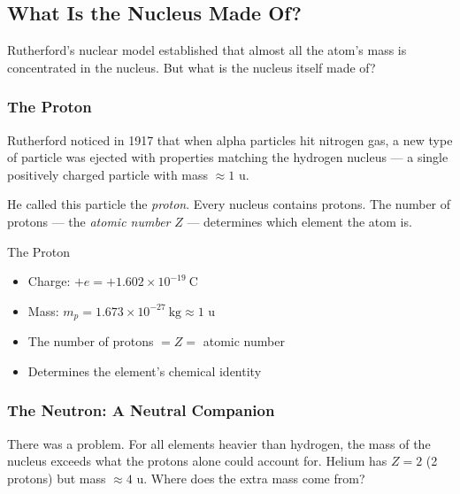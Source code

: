 \documentclass[12pt, a4paper]{book}
\theoremstyle{definition}
\newcommand{\newterm}[1]{\textit{\textcolor{DiscoveryColor}{#1}}}
\begin{document}
\subsection{What Is the Nucleus Made Of?}

Rutherford's nuclear model established that almost all
the atom's mass is concentrated in the nucleus.
But what is the nucleus itself made of?

\subsubsection{The Proton}

Rutherford noticed in 1917 that when alpha particles
hit nitrogen gas, a new type of particle was ejected
with properties matching the hydrogen nucleus ---
a single positively charged particle with mass $\approx 1$ u.

\begin{center}
\end{center}

He called this particle the \newterm{proton}.
Every nucleus contains protons.
The number of protons --- the \newterm{atomic number} $Z$ ---
determines which element the atom is.

\begin{namedconcept}{The Proton}
\begin{itemize}[nosep, leftmargin=2em]
  \item Charge: $+e = +1.602\times10^{-19}\ \si{\coulomb}$
  \item Mass: $m_p = 1.673\times10^{-27}\ \si{\kilogram} \approx 1$ u
  \item The number of protons $= Z =$ atomic number
  \item Determines the element's chemical identity
\end{itemize}
\end{namedconcept}

\subsubsection{The Neutron: A Neutral Companion}

There was a problem.
For all elements heavier than hydrogen,
the mass of the nucleus exceeds what the protons alone
could account for.
Helium has $Z = 2$ (2 protons) but mass $\approx 4$ u.
Where does the extra mass come from?
\end{document}
